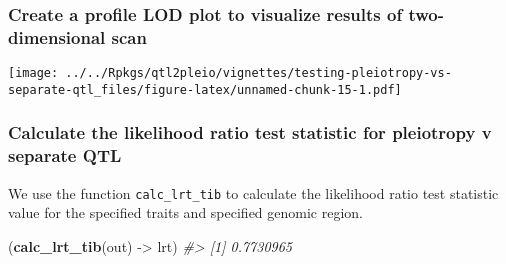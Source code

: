 \documentclass{book}
\newenvironment{Shaded}{\begin{snugshade}}{\end{snugshade}}
\newcommand{\CommentTok}[1]{\textcolor[rgb]{0.56,0.35,0.01}{\textit{#1}}}
\newcommand{\DataTypeTok}[1]{\textcolor[rgb]{0.13,0.29,0.53}{#1}}
\newcommand{\FloatTok}[1]{\textcolor[rgb]{0.00,0.00,0.81}{#1}}
\newcommand{\KeywordTok}[1]{\textcolor[rgb]{0.13,0.29,0.53}{\textbf{#1}}}
\newcommand{\NormalTok}[1]{#1}
\newcommand{\OperatorTok}[1]{\textcolor[rgb]{0.81,0.36,0.00}{\textbf{#1}}}
\newcommand{\StringTok}[1]{\textcolor[rgb]{0.31,0.60,0.02}{#1}}
\begin{document}
\hypertarget{create-a-profile-lod-plot-to-visualize-results-of-two-dimensional-scan}{%
\subsubsection{Create a profile LOD plot to visualize results of
two-dimensional
scan}\label{create-a-profile-lod-plot-to-visualize-results-of-two-dimensional-scan}}

\begin{Shaded}
\end{Shaded}

\texttt{[image: ../../Rpkgs/qtl2pleio/vignettes/testing-pleiotropy-vs-separate-qtl\_files/figure-latex/unnamed-chunk-15-1.pdf]}

\hypertarget{calculate-the-likelihood-ratio-test-statistic-for-pleiotropy-v-separate-qtl}{%
\subsubsection{Calculate the likelihood ratio test statistic for
pleiotropy v separate
QTL}\label{calculate-the-likelihood-ratio-test-statistic-for-pleiotropy-v-separate-qtl}}

We use the function \texttt{calc\_lrt\_tib} to calculate the likelihood
ratio test statistic value for the specified traits and specified
genomic region.

\begin{Shaded}
\begin{Highlighting}[]
\NormalTok{(}\KeywordTok{calc_lrt_tib}\NormalTok{(out) ->}\StringTok{ }\NormalTok{lrt)}
\CommentTok{#> [1] 0.7730965}
\end{Highlighting}
\end{Shaded}
\end{document}
